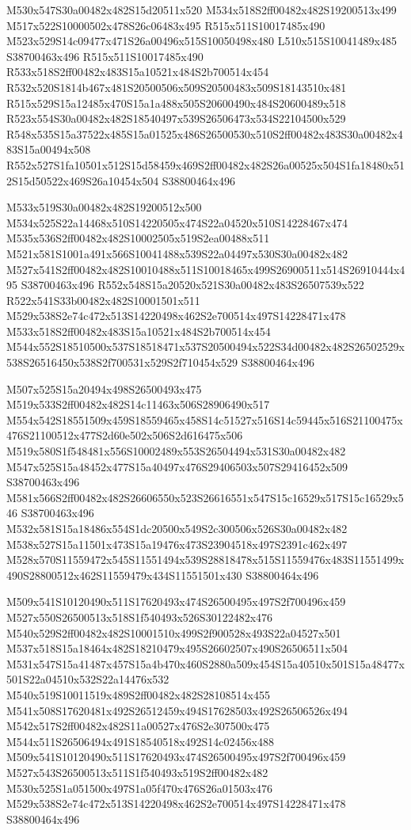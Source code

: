 \documentclass{article}
\begin{document}
\begin{multicols}{2}
M530x547S30a00482x482S15d20511x520 M534x518S2ff00482x482S19200513x499 M517x522S10000502x478S26c06483x495 R515x511S10017485x490 M523x529S14c09477x471S26a00496x515S10050498x480 L510x515S10041489x485 S38700463x496 R515x511S10017485x490 R533x518S2ff00482x483S15a10521x484S2b700514x454 R532x520S1814b467x481S20500506x509S20500483x509S18143510x481 R515x529S15a12485x470S15a1a488x505S20600490x484S20600489x518 R523x554S30a00482x482S18540497x539S26506473x534S22104500x529 R548x535S15a37522x485S15a01525x486S26500530x510S2ff00482x483S30a00482x483S15a00494x508 R552x527S1fa10501x512S15d58459x469S2ff00482x482S26a00525x504S1fa18480x512S15d50522x469S26a10454x504 S38800464x496

M533x519S30a00482x482S19200512x500 M534x525S22a14468x510S14220505x474S22a04520x510S14228467x474 M535x536S2ff00482x482S10002505x519S2ea00488x511 M521x581S1001a491x566S10041488x539S22a04497x530S30a00482x482 M527x541S2ff00482x482S10010488x511S10018465x499S26900511x514S26910444x495 S38700463x496 R552x548S15a20520x521S30a00482x483S26507539x522 R522x541S33b00482x482S10001501x511 M529x538S2e74c472x513S14220498x462S2e700514x497S14228471x478 M533x518S2ff00482x483S15a10521x484S2b700514x454 M544x552S18510500x537S18518471x537S20500494x522S34d00482x482S26502529x538S26516450x538S2f700531x529S2f710454x529 S38800464x496

M507x525S15a20494x498S26500493x475 M519x533S2ff00482x482S14c11463x506S28906490x517 M554x542S18551509x459S18559465x458S14c51527x516S14c59445x516S21100475x476S21100512x477S2d60e502x506S2d616475x506 M519x580S1f548481x556S10002489x553S26504494x531S30a00482x482 M547x525S15a48452x477S15a40497x476S29406503x507S29416452x509 S38700463x496 M581x566S2ff00482x482S26606550x523S26616551x547S15c16529x517S15c16529x546 S38700463x496 M532x581S15a18486x554S1dc20500x549S2c300506x526S30a00482x482 M538x527S15a11501x473S15a19476x473S23904518x497S2391c462x497 M528x570S11559472x545S11551494x539S28818478x515S11559476x483S11551499x490S28800512x462S11559479x434S11551501x430 S38800464x496

M509x541S10120490x511S17620493x474S26500495x497S2f700496x459 M527x550S26500513x518S1f540493x526S30122482x476 M540x529S2ff00482x482S10001510x499S2f900528x493S22a04527x501 M537x518S15a18464x482S18210479x495S26602507x490S26506511x504 M531x547S15a41487x457S15a4b470x460S2880a509x454S15a40510x501S15a48477x501S22a04510x532S22a14476x532 M540x519S10011519x489S2ff00482x482S28108514x455 M541x508S17620481x492S26512459x494S17628503x492S26506526x494 M542x517S2ff00482x482S11a00527x476S2e307500x475 M544x511S26506494x491S18540518x492S14c02456x488 M509x541S10120490x511S17620493x474S26500495x497S2f700496x459 M527x543S26500513x511S1f540493x519S2ff00482x482 M530x525S1a051500x497S1a05f470x476S26a01503x476 M529x538S2e74c472x513S14220498x462S2e700514x497S14228471x478 S38800464x496


\end{multicols}
\end{document}
